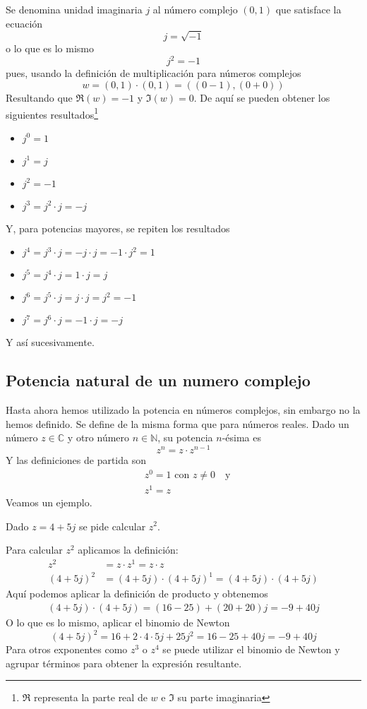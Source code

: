 Se denomina unidad imaginaria $j$ al número complejo $(0,1)$ que satisface la ecuación
$$
j = \sqrt{-1}
$$
o lo que es lo mismo
$$
j^2 = -1
$$
pues, usando la definición de multiplicación para números complejos
$$
w=(0,1)\cdot(0,1)=((0-1),(0+0))
$$
Resultando que $\Re(w)=-1$ y $\Im(w)=0$. De aquí se pueden obtener los siguientes resultados\footnote{$\Re$ representa la parte real de $w$ e $\Im$ su parte imaginaria}
\begin{itemize}
  \item $j^0 = 1$
  \item $j^1 = j$
  \item $j^2 = -1$
  \item $j^3 = j^2\cdot j= -j$
\end{itemize}
Y, para potencias mayores, se repiten los resultados
\begin{itemize}
  \item $j^4=j^3\cdot j = -j\cdot j = -1 \cdot j^2 = 1$
  \item $j^5=j^4\cdot j = 1 \cdot j = j$
  \item $j^6=j^5\cdot j = j \cdot j = j^2 = -1$
  \item $j^7=j^6\cdot j = -1 \cdot j = -j$
\end{itemize}
Y así sucesivamente.

\subsection{Potencia natural de un numero complejo}

Hasta ahora hemos utilizado la potencia en números complejos, sin embargo no la hemos definido. Se define de la misma forma que para números reales. Dado un número $z\in\mathbb{C}$ y otro número $n\in\mathbb{N}$, su potencia $n$-ésima es
$$
z^n = z \cdot z^{n-1}
$$
Y las definiciones de partida son
\begin{align*}
  &z^0 = 1 \text{ con } z\neq 0 \quad \text{y}\\ &z^1 = z
\end{align*}
Veamos un ejemplo.
\begin{example}
  Dado $z=4+5j$ se pide calcular $z^2$.

  Para calcular $z^2$ aplicamos la definición:
  \begin{align*}
    z^2 &= z \cdot z^1 = z \cdot z \\ 
    (4+5j)^2 &= (4+5j)\cdot (4+5j)^1 = (4+5j)\cdot(4+5j)
  \end{align*}
  Aquí podemos aplicar la definición de producto y obtenemos
  \begin{align*}
    (4+5j)\cdot(4+5j)=(16-25)+(20+20)j=-9+40j
  \end{align*}
  O lo que es lo mismo, aplicar el binomio de Newton
  $$
  (4+5j)^2 = 16 + 2\cdot4\cdot5j + 25j^2 = 16-25 + 40j = -9 + 40j
  $$
  Para otros exponentes como $z^3$ o $z^4$ se puede utilizar el binomio de Newton y agrupar términos para obtener la expresión resultante.
\end{example}

